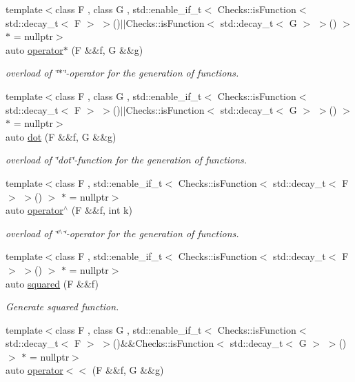 \begin{DoxyCompactItemize}
{\footnotesize template$<$class F , class G , std\-::enable\-\_\-if\-\_\-t$<$ Checks\-::is\-Function$<$ std\-::decay\-\_\-t$<$ F $>$ $>$()$|$$|$\-Checks\-::is\-Function$<$ std\-::decay\-\_\-t$<$ G $>$ $>$() $>$ $\ast$  = nullptr$>$ }\\auto \hyperlink{namespaceFunG_a267562e725c73ece1c1d057b5f29511f}{operator$\ast$} (\-F \&\&f, \-G \&\&g)
\begin{DoxyCompactList}\small\item\em overload of \char`\"{}$\ast$\char`\"{}-\/operator for the generation of functions. \end{DoxyCompactList}\item 
{\footnotesize template$<$class F , class G , std\-::enable\-\_\-if\-\_\-t$<$ Checks\-::is\-Function$<$ std\-::decay\-\_\-t$<$ F $>$ $>$()$|$$|$\-Checks\-::is\-Function$<$ std\-::decay\-\_\-t$<$ G $>$ $>$() $>$ $\ast$  = nullptr$>$ }\\auto \hyperlink{namespaceFunG_ac73eb907f3d29a9ea60513a43c658270}{dot} (\-F \&\&f, \-G \&\&g)
\begin{DoxyCompactList}\small\item\em overload of \char`\"{}dot\char`\"{}-\/function for the generation of functions. \end{DoxyCompactList}\item 
{\footnotesize template$<$class F , std\-::enable\-\_\-if\-\_\-t$<$ Checks\-::is\-Function$<$ std\-::decay\-\_\-t$<$ F $>$ $>$() $>$ $\ast$  = nullptr$>$ }\\auto \hyperlink{namespaceFunG_a94273e3ea80324e591bb98ae3c051221}{operator$^\wedge$} (\-F \&\&f, int k)
\begin{DoxyCompactList}\small\item\em overload of \char`\"{}$^\wedge$\char`\"{}-\/operator for the generation of functions. \end{DoxyCompactList}\item 
{\footnotesize template$<$class F , std\-::enable\-\_\-if\-\_\-t$<$ Checks\-::is\-Function$<$ std\-::decay\-\_\-t$<$ F $>$ $>$() $>$ $\ast$  = nullptr$>$ }\\auto \hyperlink{namespaceFunG_ac4ffc0754104af6ddf114e154251db78}{squared} (\-F \&\&f)
\begin{DoxyCompactList}\small\item\em \-Generate squared function. \end{DoxyCompactList}\item 
{\footnotesize template$<$class F , class G , std\-::enable\-\_\-if\-\_\-t$<$ Checks\-::is\-Function$<$ std\-::decay\-\_\-t$<$ F $>$ $>$()\&\&\-Checks\-::is\-Function$<$ std\-::decay\-\_\-t$<$ G $>$ $>$() $>$ $\ast$  = nullptr$>$ }\\auto \hyperlink{namespaceFunG_a65436d4494e99629b0177d0df7634a6b}{operator$<$$<$} (\-F \&\&f, \-G \&\&g)

\end{DoxyCompactItemize}
